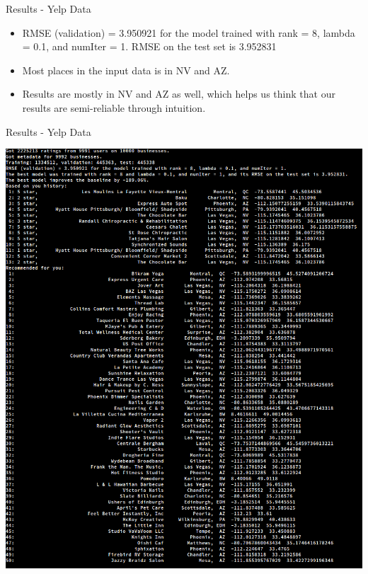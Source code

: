 \documentclass{beamer}
\begin{document}
\begin{frame}{Results - Yelp Data}{}

  \begin{itemize}
      \item {
        RMSE (validation) = 3.950921 for the model trained with rank = 8, lambda = 0.1, and numIter = 1.
        RMSE on the test set is 3.952831
      }
      \item {
        Most places in the input data is in NV and AZ.
      }
      \item {
        Results are mostly in NV and AZ as well, which helps us think that our results are semi-reliable through intuition.
      }
  \end{itemize}
  
\end{frame}


\begin{frame}{Results - Yelp Data}{}

      \includegraphics[width=1\textwidth]{image/yelp_results}
  
\end{frame}
\end{document}
